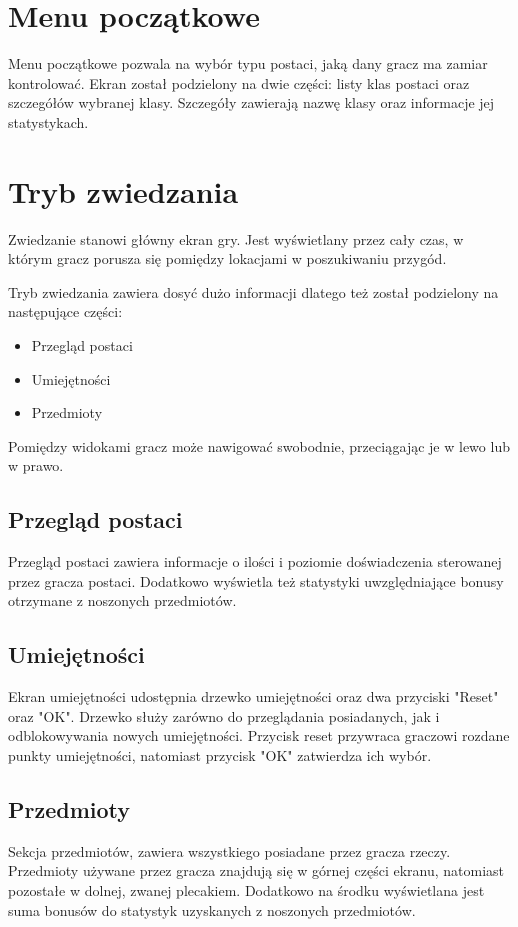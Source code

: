 \documentclass	{xmgr}
\begin{document}
\section{Menu początkowe}
Menu początkowe pozwala na wybór typu postaci, jaką dany gracz ma zamiar kontrolować. Ekran został podzielony na dwie części: listy klas postaci oraz szczegółów wybranej klasy. Szczegóły zawierają nazwę klasy oraz informacje jej statystykach.

\section{Tryb zwiedzania}
Zwiedzanie stanowi główny ekran gry. Jest wyświetlany przez cały czas, w którym gracz porusza się pomiędzy lokacjami w poszukiwaniu przygód. 

Tryb zwiedzania zawiera dosyć dużo informacji dlatego też został podzielony na następujące części: 
\begin{itemize}
	\item Przegląd postaci
	\item Umiejętności
	\item Przedmioty
\end{itemize}
Pomiędzy widokami gracz może nawigować swobodnie, przeciągając je w lewo lub w prawo.
\subsection*{Przegląd postaci}
Przegląd postaci zawiera informacje o ilości i poziomie doświadczenia sterowanej przez gracza postaci. Dodatkowo wyświetla też statystyki uwzględniające bonusy otrzymane z noszonych przedmiotów.
\subsection*{Umiejętności}
Ekran umiejętności udostępnia drzewko umiejętności oraz dwa przyciski "Reset" oraz "OK". Drzewko służy zarówno do przeglądania posiadanych, jak i odblokowywania nowych umiejętności. Przycisk reset przywraca graczowi rozdane punkty umiejętności, natomiast przycisk "OK" zatwierdza ich wybór.
\subsection*{Przedmioty}
Sekcja przedmiotów, zawiera wszystkiego posiadane przez gracza rzeczy. Przedmioty używane przez gracza znajdują się w górnej części ekranu, natomiast pozostałe w dolnej, zwanej plecakiem. Dodatkowo na środku wyświetlana jest suma bonusów do statystyk uzyskanych z noszonych przedmiotów.
\end{document}
